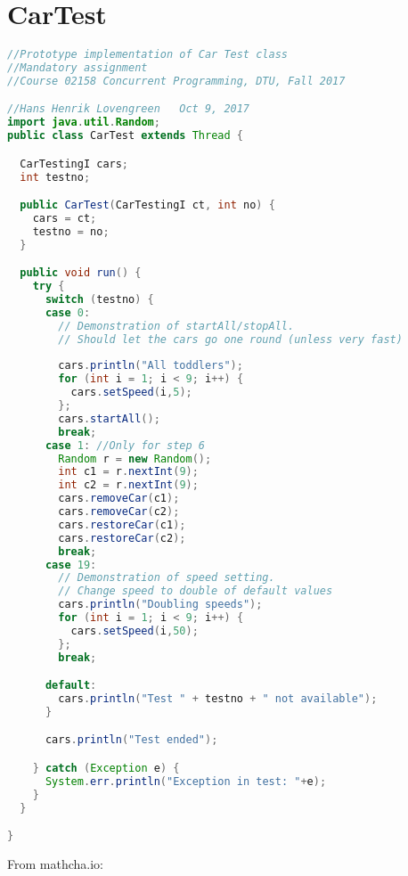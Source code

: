 \section*{CarTest}
\begin{lstlisting}[language=java]
//Prototype implementation of Car Test class
//Mandatory assignment
//Course 02158 Concurrent Programming, DTU, Fall 2017

//Hans Henrik Lovengreen   Oct 9, 2017
import java.util.Random;
public class CarTest extends Thread {

  CarTestingI cars;
  int testno;

  public CarTest(CarTestingI ct, int no) {
    cars = ct;
    testno = no;
  }

  public void run() {
    try {
      switch (testno) { 
      case 0:
        // Demonstration of startAll/stopAll.
        // Should let the cars go one round (unless very fast)
        
        cars.println("All toddlers");
        for (int i = 1; i < 9; i++) {
          cars.setSpeed(i,5);
        };
        cars.startAll();
        break;
      case 1: //Only for step 6
        Random r = new Random();
        int c1 = r.nextInt(9);
        int c2 = r.nextInt(9);
        cars.removeCar(c1);
        cars.removeCar(c2);
        cars.restoreCar(c1);
        cars.restoreCar(c2);
        break;
      case 19:
        // Demonstration of speed setting.
        // Change speed to double of default values
        cars.println("Doubling speeds");
        for (int i = 1; i < 9; i++) {
          cars.setSpeed(i,50);
        };
        break;

      default:
        cars.println("Test " + testno + " not available");
      }

      cars.println("Test ended");

    } catch (Exception e) {
      System.err.println("Exception in test: "+e);
    }
  }

}
\end{lstlisting}

From mathcha.io:



\begin{tikzpicture}[x=0.75pt,y=0.75pt,yscale=-1,xscale=1]





\end{tikzpicture}
